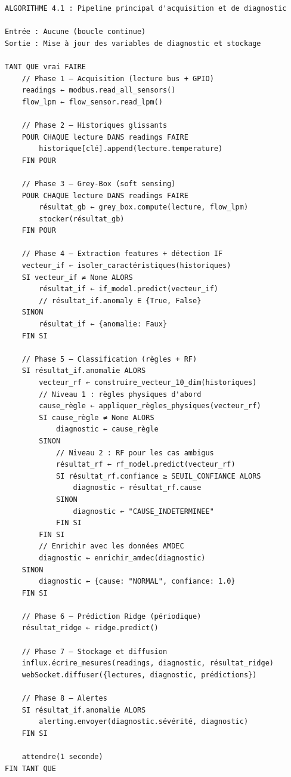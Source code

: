\begin{center}
\begin{minipage}{0.90\textwidth}
\begin{verbatim}
ALGORITHME 4.1 : Pipeline principal d'acquisition et de diagnostic

Entrée : Aucune (boucle continue)
Sortie : Mise à jour des variables de diagnostic et stockage

TANT QUE vrai FAIRE
    // Phase 1 — Acquisition (lecture bus + GPIO)
    readings ← modbus.read_all_sensors()
    flow_lpm ← flow_sensor.read_lpm()
    
    // Phase 2 — Historiques glissants
    POUR CHAQUE lecture DANS readings FAIRE
        historique[clé].append(lecture.temperature)
    FIN POUR
    
    // Phase 3 — Grey-Box (soft sensing)
    POUR CHAQUE lecture DANS readings FAIRE
        résultat_gb ← grey_box.compute(lecture, flow_lpm)
        stocker(résultat_gb)
    FIN POUR
    
    // Phase 4 — Extraction features + détection IF
    vecteur_if ← isoler_caractéristiques(historiques)
    SI vecteur_if ≠ None ALORS
        résultat_if ← if_model.predict(vecteur_if)
        // résultat_if.anomaly ∈ {True, False}
    SINON
        résultat_if ← {anomalie: Faux}
    FIN SI
    
    // Phase 5 — Classification (règles + RF)
    SI résultat_if.anomalie ALORS
        vecteur_rf ← construire_vecteur_10_dim(historiques)
        // Niveau 1 : règles physiques d'abord
        cause_règle ← appliquer_règles_physiques(vecteur_rf)
        SI cause_règle ≠ None ALORS
            diagnostic ← cause_règle
        SINON
            // Niveau 2 : RF pour les cas ambigus
            résultat_rf ← rf_model.predict(vecteur_rf)
            SI résultat_rf.confiance ≥ SEUIL_CONFIANCE ALORS
                diagnostic ← résultat_rf.cause
            SINON
                diagnostic ← "CAUSE_INDETERMINEE"
            FIN SI
        FIN SI
        // Enrichir avec les données AMDEC
        diagnostic ← enrichir_amdec(diagnostic)
    SINON
        diagnostic ← {cause: "NORMAL", confiance: 1.0}
    FIN SI
    
    // Phase 6 — Prédiction Ridge (périodique)
    résultat_ridge ← ridge.predict()
    
    // Phase 7 — Stockage et diffusion
    influx.écrire_mesures(readings, diagnostic, résultat_ridge)
    webSocket.diffuser({lectures, diagnostic, prédictions})
    
    // Phase 8 — Alertes
    SI résultat_if.anomalie ALORS
        alerting.envoyer(diagnostic.sévérité, diagnostic)
    FIN SI
    
    attendre(1 seconde)
FIN TANT QUE
\end{verbatim}
\end{minipage}
\end{center}

